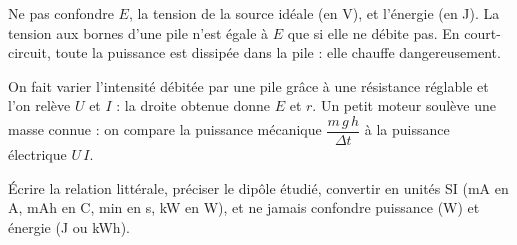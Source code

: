 \begin{attention}
Ne pas confondre $E$, la tension de la source idéale (en V), et l'énergie (en J). La tension aux bornes d'une pile n'est égale à $E$ que
si elle ne débite pas. En court-circuit, toute la puissance est dissipée dans la pile : elle chauffe dangereusement.
\end{attention}
\begin{experience}
On fait varier l'intensité débitée par une pile grâce à une résistance réglable et l'on relève $U$ et $I$ : la droite obtenue donne $E$
et $r$. Un petit moteur soulève une masse connue : on compare la puissance mécanique $\dfrac{m\,g\,h}{\Delta t}$ à la puissance électrique $U\,I$.
\end{experience}
\begin{rediger}
Écrire la relation littérale, préciser le dipôle étudié, convertir en unités SI (mA en A, mAh en C, min en s, kW en W),
et ne jamais confondre puissance (W) et énergie (J ou kWh).
\end{rediger}
\exercices

